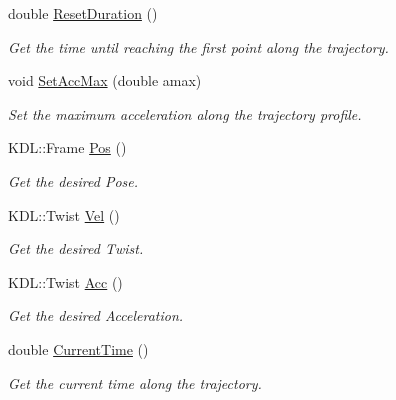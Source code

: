 \begin{DoxyCompactItemize}
double \hyperlink{class_trajectory_generator_a5ad2939e56c676d8643ac2410a896304}{Reset\+Duration} ()
\begin{DoxyCompactList}\small\item\em Get the time until reaching the first point along the trajectory. \end{DoxyCompactList}\item 
void \hyperlink{class_trajectory_generator_a4a9bbab31d78a11ad80778ac83e8713d}{Set\+Acc\+Max} (double amax)
\begin{DoxyCompactList}\small\item\em Set the maximum acceleration along the trajectory profile. \end{DoxyCompactList}\item 
\mbox{\label{class_trajectory_generator_abad83c273a137e0328a0f6d24cd921ef}} 
K\+D\+L\+::\+Frame \hyperlink{class_trajectory_generator_abad83c273a137e0328a0f6d24cd921ef}{Pos} ()
\begin{DoxyCompactList}\small\item\em Get the desired Pose. \end{DoxyCompactList}\item 
\mbox{\label{class_trajectory_generator_a18d857f5252abaa40a63702799a5261b}} 
K\+D\+L\+::\+Twist \hyperlink{class_trajectory_generator_a18d857f5252abaa40a63702799a5261b}{Vel} ()
\begin{DoxyCompactList}\small\item\em Get the desired Twist. \end{DoxyCompactList}\item 
\mbox{\label{class_trajectory_generator_a124d9b6a30160957b28ee7ecd4255d88}} 
K\+D\+L\+::\+Twist \hyperlink{class_trajectory_generator_a124d9b6a30160957b28ee7ecd4255d88}{Acc} ()
\begin{DoxyCompactList}\small\item\em Get the desired Acceleration. \end{DoxyCompactList}\item 
\mbox{\label{class_trajectory_generator_a28906b3717439a0b1bdaa3ebbe93815b}} 
double \hyperlink{class_trajectory_generator_a28906b3717439a0b1bdaa3ebbe93815b}{Current\+Time} ()
\begin{DoxyCompactList}\small\item\em Get the current time along the trajectory. \end{DoxyCompactList}\item 

\end{DoxyCompactItemize}
